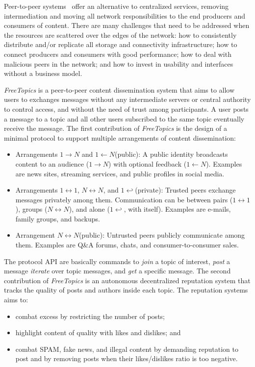 \documentclass[12pt]{article}
\newcommand{\FC} {\emph{FreeTopics}\xspace}
\newcommand{\Xon} {$1{\rightarrow}N$\xspace}
\newcommand{\Xno} {$1{\leftarrow}N$\xspace}
\newcommand{\Xnn} {$N{\leftrightarrow}N$\xspace}
\newcommand{\Xoo} {$1{\leftrightarrow}1$\xspace}
\newcommand{\Xo}  {$1{\hookleftarrow}$\xspace}
\begin{document}
Peer-to-peer systems~\cite{TODO} offer an alternative to centralized services,
removing intermediation and moving all network responsibilities to the end
producers and consumers of content.
There are many challenges that need to be addressed when the resources are
scattered over the edges of the network:
    how to consistently distribute and/or replicate all storage and
    connectivity infrastructure;
    how to connect producers and consumers with good performance;
    how to deal with malicious peers in the network; and
    how to invest in usability and interfaces without a business model.

\newpage

\FC is a peer-to-peer content dissemination system that aims to allow users to
exchanges messages without any intermediate servers or central authority to
control access, and without the need of trust among participants.
A user posts a message to a topic and all other users subscribed to the same
topic eventually receive the message.
The first contribution of \FC is the design of a minimal protocol to support
multiple arrangements of content dissemination:
%
\begin{itemize}
\item Arrangements \Xon and \Xno (public):
    A public identity broadcasts content to an audience (\Xon) with optional
    feedback (\Xno).
    Examples are news sites, streaming services, and public profiles in social
    media.
\item Arrangements \Xoo, \Xnn, and \Xo (private):
    Trusted peers exchange messages privately among them.
    Communication can be between pairs (\Xoo), groups (\Xnn), and alone (\Xo,
    with itself).
    Examples are e-mails, family groups, and backups.
\item Arrangement \Xnn (public):
    Untrusted peers publicly communicate among them.
    Examples are Q\&A forums, chats, and consumer-to-consumer sales.
\end{itemize}
%
The protocol API are basically commands to \emph{join} a topic of interest,
\emph{post} a message \emph{iterate} over topic messages, and \emph{get} a
specific message.
%
The second contribution of \FC is an autonomous decentralized reputation system
that tracks the quality of posts and authors inside each topic.
The reputation systems aims to:
%
\begin{itemize}
\item combat excess by restricting the number of posts;
\item highlight content of quality with likes and dislikes; and
\item combat SPAM, fake news, and illegal content by demanding reputation to
      post and by removing posts when their likes/dislikes ratio is too
      negative.
\end{itemize}
\end{document}
